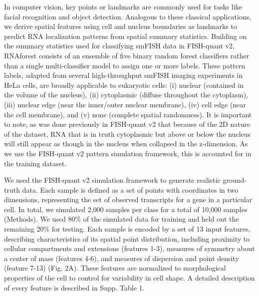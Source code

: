In computer vision, key points or landmarks are commonly used for tasks like facial recognition\cite{violaRapidObjectDetection2001} and object detection. Analogous to these classical applications, we derive spatial features using cell and nucleus boundaries as landmarks to predict RNA localization patterns from spatial summary statistics. Building on the summary statistics used for classifying smFISH data in FISH-quant v2\cite{imbertFISHquantV2Scalable2022}, RNAforest consists of an ensemble of five binary random forest classifiers rather than a single multi-classifier model to assign one or more labels. These pattern labels, adapted from several high-throughput smFISH imaging experiments in HeLa cells\cite{battichImagebasedTranscriptomicsThousands2013,stoegerComputerVisionImagebased2015,samacoitsComputationalFrameworkStudy2018,chouaibDualProteinmRNALocalization2020}, are broadly applicable to eukaryotic cells: (i) nuclear (contained in the volume of the nucleus), (ii) cytoplasmic (diffuse throughout the cytoplasm), (iii) nuclear edge (near the inner/outer nuclear membrane), (iv) cell edge (near the cell membrane), and (v) none (complete spatial randomness). It is important to note, as was done previously in  FISH-quant v2\cite{imbertFISHquantV2Scalable2022} that because of the 2D nature of the dataset, RNA that is in truth cytoplasmic but above or below the nucleus will still appear as though in the nucleus when collapsed in the z-dimension. As we use the FISH-quant v2 pattern simulation framework, this is accounted for in the training dataset.

We used the FISH-quant v2 simulation framework to generate realistic ground-truth data\cite{samacoitsComputationalFrameworkStudy2018}. Each sample is defined as a set of points with coordinates in two dimensions, representing the set of observed transcripts for a gene in a particular cell. In total, we simulated 2,000 samples per class for a total of 10,000 samples (Methods). We used 80\% of the simulated data for training and held out the remaining 20\% for testing. Each sample is encoded by a set of 13 input features, describing characteristics of its spatial point distribution, including proximity to cellular compartments and extensions (features 1-3), measures of symmetry about a center of mass (features 4-6), and measures of dispersion and point density (feature 7-13) (Fig. 2A). These features are normalized to morphological properties of the cell to control for variability in cell shape. A detailed description of every feature is described in Supp. Table 1. 

